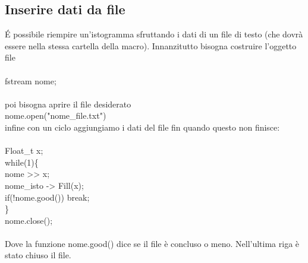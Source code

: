 \documentclass[10pt,a4paper]{article}
\begin{document}
\subsection{Inserire dati da file}
\'{E} possibile riempire un'istogramma sfruttando i dati di un file di testo (che dovrà essere nella stessa cartella della macro). Innanzitutto bisogna costruire l'oggetto file\\\\
fstream nome;\\\\
poi bisogna aprire il file desiderato\\
nome.open("nome\_file.txt")\\
infine con un ciclo aggiungiamo i dati del file fin quando questo non finisce:\\\\
Float\_t x;\\
while(1)\{\\
	nome >> x;\\
	nome\_isto -> Fill(x);\\
	if(!nome.good()) break;\\
\}\\
nome.close();\\\\

Dove la funzione nome.good() dice se il file è concluso o meno. Nell'ultima riga è stato chiuso il file. 
\end{document}

